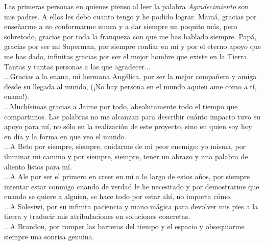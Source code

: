 \documentclass[
11pt, %
spanish, %
singlespacing, %
headsepline, %
]{MastersDoctoralThesis} %
\begin{document}

\begin{acknowledgements}
\addchaptertocentry{\acknowledgementname} %

Las primeras personas en quienes pienso al leer la palabra \textit{Agradecimiento} son mis padres. A ellos les debo cuanto tengo y he podido lograr. Mamá, gracias por enseñarme a no conformarme nunca y a dar siempre un poquito más, pero sobretodo, gracias por toda la franqueza con que me has hablado siempre. Papá, gracias por ser mi Superman, por siempre confiar en mí y por el eterno apoyo que me has dado, infinitas gracias por ser el mejor hombre que existe en la Tierra.\\

Tantas y tantas personas a las que agradecer...\\

...Gracias a la enana, mi hermana Angélica, por ser la mejor compañera y amiga desde su llegada al mundo, (¡No hay persona en el mundo aquien ame como a tí, enana!). \\

...Muchísimas gracias a Jaime por todo, absolutamente todo el tiempo que compartimos. Las palabras no me alcanzan para describir cuánto impacto tuvo su apoyo para mí, no sólo en la realización de este proyecto, sino en quien soy hoy en día y la forma en que veo el mundo.\\

...A Beto por siempre, siempre, cuidarme de mi peor enemigo: yo misma, por iluminar mi camino y por siempre, siempre, tener un abrazo y una palabra de aliento listos para mí. \\

...A Ale por ser el primero en creer en mí a lo largo de estos años, por siempre intentar estar conmigo cuando de verdad le he necesitado y por demostrarme que cuando se quiere a alguien, se hace todo por estar ahí, no importa cómo.\\

...A Solesiwi, por su infinita paciencia y mano mágica para devolver mis pies a la tierra y traducir mis atribulaciones en soluciones concretas.\\

...A Brandon, por romper las barreras del tiempo y el espacio y obsequiarme siempre una sonrisa genuina.\\


\end{acknowledgements}
\end{document}
